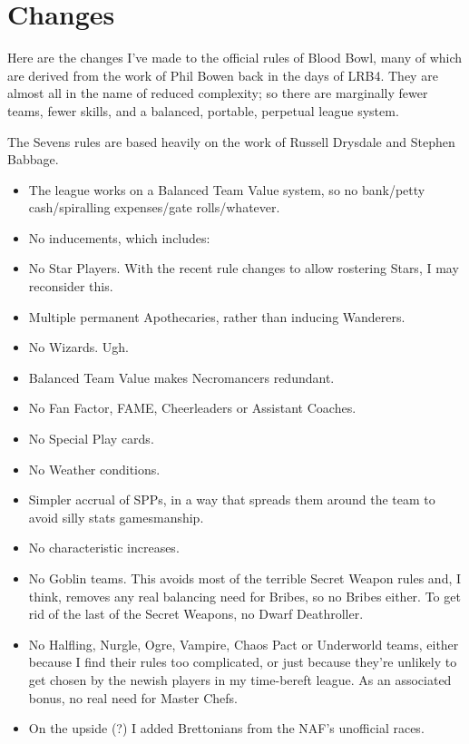 \section{Changes}

\begin{multicols}{2}

\par Here are the changes I've made to the official rules of Blood Bowl, many of which are derived from the work of Phil Bowen back in the days of LRB4. They are almost all in the name of reduced complexity; so there are marginally fewer teams, fewer skills, and a balanced, portable, perpetual league system.
\par The Sevens rules are based heavily on the work of Russell Drysdale and Stephen Babbage.

\begin{itemize}
\item The league works on a Balanced Team Value system, so no bank/petty cash/spiralling expenses/gate rolls/whatever.
\item No inducements, which includes:
\item No Star Players. With the recent rule changes to allow rostering Stars, I may reconsider this.
\item Multiple permanent Apothecaries, rather than inducing Wanderers.
\item No Wizards. Ugh.
\item Balanced Team Value makes Necromancers redundant.
\item No Fan Factor, FAME, Cheerleaders or Assistant Coaches.
\item No Special Play cards.
\item No Weather conditions.
\item Simpler accrual of SPPs, in a way that spreads them around the team to avoid silly stats gamesmanship.
\item No characteristic increases.
\item No Goblin teams. This avoids most of the terrible Secret Weapon rules and, I think, removes any real balancing need for Bribes, so no Bribes either. To get rid of the last of the Secret Weapons, no Dwarf Deathroller.
\item No Halfling, Nurgle, Ogre, Vampire, Chaos Pact or Underworld teams, either because I find their rules too complicated, or just because they're unlikely to get chosen by the newish players in my time-bereft league. As an associated bonus, no real need for Master Chefs.
\item On the upside (?) I added Brettonians from the NAF's unofficial races.

\end{itemize}
\end{multicols}
